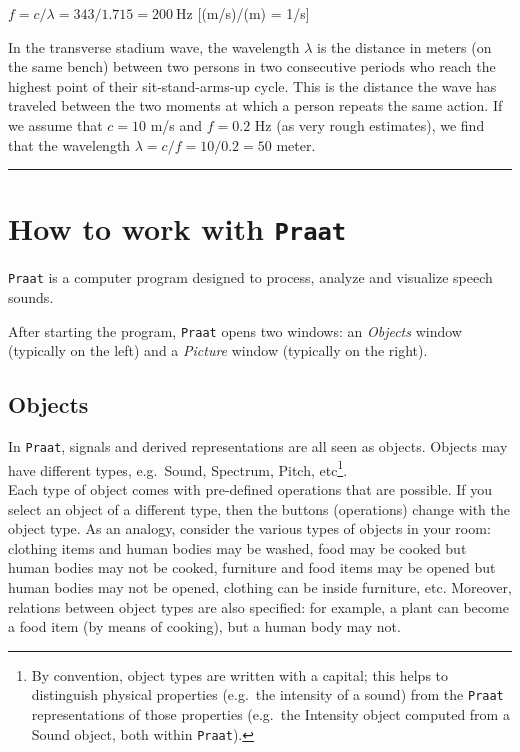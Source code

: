 \documentclass[
]{book}
\begin{document}
\(f = c / \lambda = 343 / 1.715 = 200\ \textrm{Hz}\) {[}(m/s)/(m) = 1/s{]}

In the transverse stadium wave, the wavelength \(\lambda\) is the distance in meters (on the same bench) between two persons in two consecutive periods who reach the highest point of their sit-stand-arms-up cycle. This is the distance the wave has traveled between the two moments at which a person repeats the same action. If we assume that \(c=10\) m/s and \(f=0.2\) Hz (as very rough estimates), we find that the wavelength \(\lambda=c/f=10/0.2=50\) meter.

\begin{center}\rule{0.5\linewidth}{0.5pt}\end{center}

\protect{}\label{box-praatintro}
\section{\texorpdfstring{How to work with \texttt{Praat}}{How to work with Praat}}\label{sec:praatintro}

\texttt{Praat} is a computer program designed to process, analyze and visualize speech sounds.

After starting the program, \texttt{Praat} opens two windows: an \emph{Objects} window (typically on the left) and a \emph{Picture} window (typically on the right).

\subsection*{Objects}\label{objects}

In \texttt{Praat}, signals and derived representations are all seen as objects. Objects may have different types, e.g.~Sound, Spectrum, Pitch, etc\footnote{By convention, object types are written with a capital; this helps to distinguish physical properties (e.g.~the intensity of a sound) from the \texttt{Praat} representations of those properties (e.g.~the Intensity object computed from a Sound object, both within \texttt{Praat}).}.\\
Each type of object comes with pre-defined operations that are possible. If you select an object of a different type, then the buttons (operations) change with the object type.
As an analogy, consider the various types of objects in your room: clothing items and human bodies may be washed, food may be cooked but human bodies may not be cooked, furniture and food items may be opened but human bodies may not be opened, clothing can be inside furniture, etc. Moreover, relations between object types are also specified: for example, a plant can become a food item (by means of cooking), but a human body may not.
\end{document}
